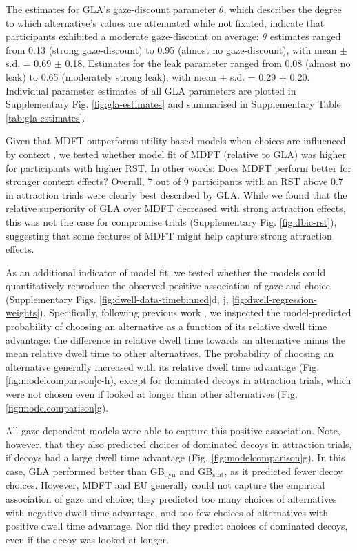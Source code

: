 \documentclass[11pt, a4paper]{article}
\begin{document}
The estimates for GLA’s gaze-discount parameter $\theta$, which describes the degree to which alternative’s values are attenuated while not fixated, indicate that participants exhibited a moderate gaze-discount on average: $\theta$ estimates ranged from 0.13 (strong gaze-discount) to 0.95 (almost no gaze-discount), with mean $\pm$ s.d. = 0.69 $\pm$ 0.18. Estimates for the leak parameter ranged from 0.08 (almost no leak) to 0.65 (moderately strong leak), with mean $\pm$ s.d. = 0.29 $\pm$ 0.20. Individual parameter estimates of all GLA parameters are plotted in Supplementary Fig. \ref{fig:gla-estimates} and summarised in Supplementary Table \ref{tab:gla-estimates}.

Given that MDFT outperforms utility-based models when choices are influenced by context \parencite{berkowitsch2014RigorouslyTestingMultialternative}, we tested whether model fit of MDFT (relative to GLA) was higher for participants with higher RST. In other words: Does MDFT perform better for stronger context effects? Overall, 7 out of 9 participants with an RST above 0.7 in attraction trials were clearly best described by GLA. While we found that the relative superiority of GLA over MDFT decreased with strong attraction effects, this was not the case for compromise trials (Supplementary Fig. \ref{fig:dbic-rst}), suggesting that some features of MDFT might help capture strong attraction effects.

As an additional indicator of model fit, we tested whether the models could quantitatively reproduce the observed positive association of gaze and choice (Supplementary Figs. \ref{fig:dwell-data-timebinned}d, j, \ref{fig:dwell-regression-weights}). Specifically, following previous work \parencite{krajbich2010VisualFixationsComputation,krajbich2011MultialternativeDriftdiffusionModel}, we inspected the model-predicted probability of choosing an alternative as a function of its relative dwell time advantage: the difference in relative dwell time towards an alternative minus the mean relative dwell time to other alternatives. The probability of choosing an alternative generally increased with its relative dwell time advantage (Fig. \ref{fig:modelcomparison}c-h), except for dominated decoys in attraction trials, which were not chosen even if looked at longer than other alternatives (Fig. \ref{fig:modelcomparison}g).

All gaze-dependent models were able to capture this positive association. Note, however, that they also predicted choices of dominated decoys in attraction trials, if decoys had a large dwell time advantage (Fig. \ref{fig:modelcomparison}g). In this case, GLA performed better than GB$_{\text{dyn}}$ and GB$_{\text{stat}}$, as it predicted fewer decoy choices. However, MDFT and EU generally could not capture the empirical association of gaze and choice; they predicted too many choices of alternatives with negative dwell time advantage, and too few choices of alternatives with positive dwell time advantage. 
Nor did they predict choices of dominated decoys, even if the decoy was looked at longer.
\end{document}
